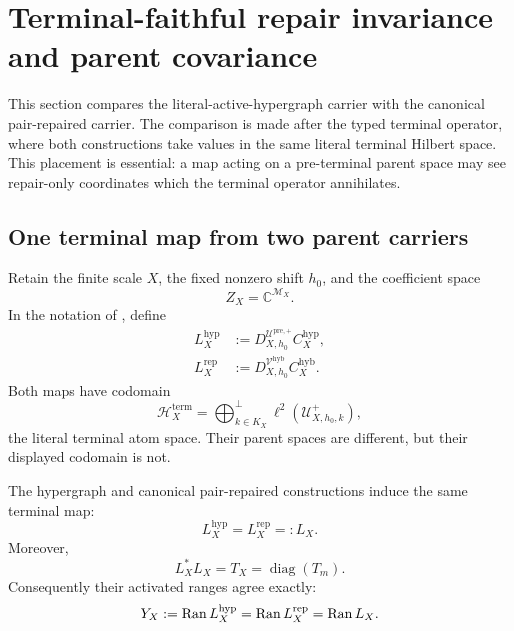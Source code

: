 \section{Terminal-faithful repair invariance and parent covariance}
\label{sec:tpc65-repair-invariance}

This section compares the literal-active-hypergraph carrier with the
canonical pair-repaired carrier.  The comparison is made after the typed
terminal operator, where both constructions take values in the same literal
terminal Hilbert space.  This placement is essential: a map acting on a
pre-terminal parent space may see repair-only coordinates which the terminal
operator annihilates.

\subsection{One terminal map from two parent carriers}

Retain the finite scale \(X\), the fixed nonzero shift \(h_0\), and the
coefficient space
\[
 Z_X=\mathbb C^{\mathcal M_X}.
\]
In the notation of \citet{WangTPC64}, define
\begin{align}
 L_X^{\mathrm{hyp}}
 &:=
 D_{X,h_0}^{\mathcal U^{\mathrm{pre},+}}
 C_X^{\mathrm{hyp}},
 \label{eq:tpc65-hypergraph-terminal-map}\\
 L_X^{\mathrm{rep}}
 &:=
 D_{X,h_0}^{\mathcal V^{\mathrm{hyb}}}
 C_X^{\mathrm{hyb}}.
 \label{eq:tpc65-repaired-terminal-map}
\end{align}
Both maps have codomain
\[
 \mathcal H_X^{\mathrm{term}}
 =
 \bigoplus_{k\in K_X}^{\perp}
 \ell^2(\mathcal U_{X,h_0,k}^{+}),
\]
the literal terminal atom space.  Their parent spaces are different, but
their displayed codomain is not.

\begin{theorem}
\label{thm:tpc65-common-terminal-map}
The hypergraph and canonical pair-repaired constructions
induce the same terminal map:
\begin{equation}
 \boxed{
 L_X^{\mathrm{hyp}}=L_X^{\mathrm{rep}}=:L_X.}
 \label{eq:tpc65-common-terminal-map}
\end{equation}
Moreover,
\begin{equation}
 \boxed{
 L_X^*L_X=T_X=\operatorname{diag}(T_m).}
 \label{eq:tpc65-common-terminal-gram}
\end{equation}
Consequently their activated ranges agree exactly:
\begin{equation}
 Y_X:=\operatorname{Ran} L_X^{\mathrm{hyp}}
     =\operatorname{Ran} L_X^{\mathrm{rep}}
     =\operatorname{Ran} L_X.
 \label{eq:tpc65-common-activated-range}
\end{equation}
\end{theorem}

